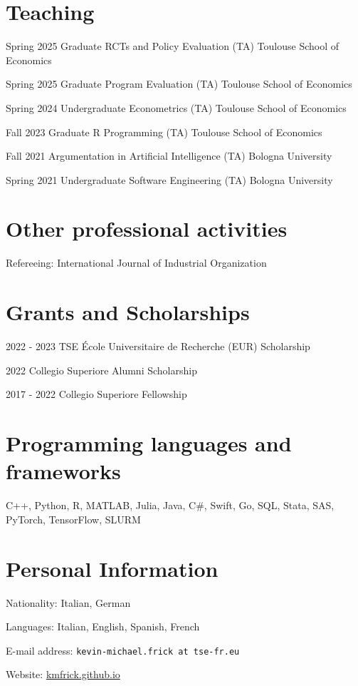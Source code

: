 \documentclass[11pt,a4paper]{article}
\begin{document}
\begin{cv}
  \section*{Teaching}
  \begin{cvlist}{}
  \itemsep -5pt
  \item[Spring 2025] Graduate RCTs and Policy Evaluation (TA) \hfill Toulouse School of Economics
  \item[Spring 2025] Graduate Program Evaluation (TA) \hfill Toulouse School of Economics
\item[Spring 2024] Undergraduate Econometrics (TA) \hfill Toulouse School of Economics
\item[Fall 2023] Graduate R Programming (TA) \hfill Toulouse School of Economics
  \item[Fall 2021] Argumentation in Artificial Intelligence (TA) \hfill Bologna University
  \item[Spring 2021] Undergraduate Software Engineering (TA) \hfill Bologna University
  \end{cvlist}
  \vspace{-24pt}
\section*{Other professional activities}
Refereeing: International Journal of Industrial Organization
\vspace{-12pt}
\section*{Grants and Scholarships}
\begin{cvlist}{}
	\itemsep -5pt
	\item[2022 - 2023] TSE École Universitaire de Recherche (EUR) Scholarship
	\item[2022] Collegio Superiore Alumni Scholarship
	\item[2017 - 2022] Collegio Superiore Fellowship
\end{cvlist}
\vspace{-24pt}
\section*{Programming languages and frameworks}
    C++, Python, R, MATLAB, Julia, Java, C\#, Swift, Go, SQL, Stata, SAS, PyTorch, TensorFlow, SLURM
\vspace{-12pt}
\section*{Personal Information}
\begin{cvlist}{}
	\itemsep -5pt
	\item[Nationality:] Italian, German
  \item[Languages:]  Italian, English, Spanish, French
  \item[E-mail address:] \texttt{kevin-michael.frick at tse-fr.eu}
  \item[Website:] \url{kmfrick.github.io}
\end{cvlist}
\end{cv}
\end{document}
